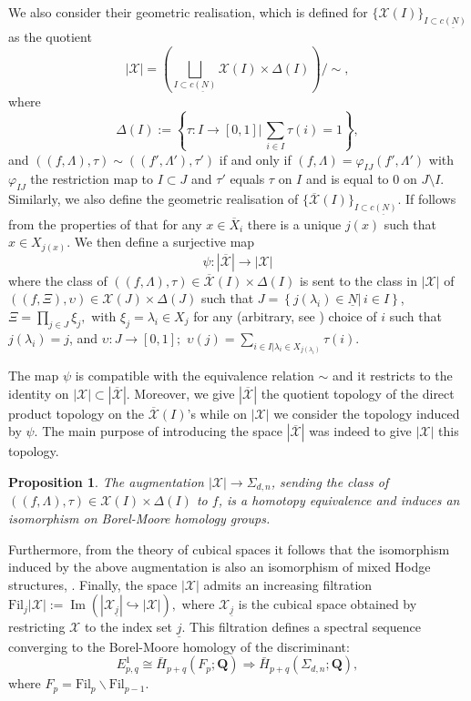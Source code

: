 \documentclass[10pt,a4paper,twoside]{amsart}
\theoremstyle{plain}
\newtheorem{prop}[theo]{Proposition}
\theoremstyle{definition}
\theoremstyle{remark}
\begin{document}
We also consider their geometric realisation, which is defined for $\{\mathcal{X}(I)\}_{I\subset\underline{c(N)}}$ as the quotient
$$|\mathcal{X}|=\left(\bigsqcup_{I\subset\underline{c(N)}}\mathcal{X}(I)\times \Delta(I)\right)/\sim,$$
where 
$$\Delta(I):=\left\{\tau:I\rightarrow\left[0,1\right]|\,\sum_{i\in I} \tau(i)=1\right\},$$ 
and $((f,\Lambda),\tau)\sim((f',\Lambda'),\tau')$ if and only if $(f,\Lambda)=\varphi_{IJ}(f',\Lambda')$ with $\varphi_{IJ}$ the restriction map to $I \subset J$  and $\tau'$ equals $\tau$ on $I$ and is equal to $0$ on $J \setminus I$. 
Similarly, we also define the geometric realisation of $\{\overline{\mathcal{X}}(I)\}_{I\subset\underline{c(N)}}$. 
If follows from the properties of \cite[List 2.3]{TomM4} that for any $x \in \overline{X}_i$ there is a unique $j(x)$ such that $x \in X_{j(x)}$. We then define a surjective map
$$\psi:|\overline{\mathcal{X}}|\rightarrow |{\mathcal{X}}|$$
where the class of $((f,\Lambda),\tau)\in\overline{\mathcal{X}}(I)\times\Delta(I)$ is sent to the class in $|{\mathcal{X}}|$ 
of $((f,\Xi),\upsilon)\in \mathcal{X}(J)\times\Delta(J)$ such that $J=\left\{j(\lambda_i)\in\underline{N}|\, i\in I \right\}$, $\Xi=\prod_{j\in J}\xi_j,$ with $\xi_j=\lambda_i\in X_j$ for any (arbitrary, see \cite[List 2.3]{TomM4}) choice of $i$ such that $j(\lambda_i)=j$, and $\upsilon:J\rightarrow \left[0,1\right];$ $\upsilon(j)=\sum_{i\in I | \lambda_i\in X_{j(\lambda_i)}}\tau(i).$

The map $\psi$ is compatible with the equivalence relation $\sim$ and it restricts to the identity on $|{\mathcal{X}}|\subset|\overline{\mathcal{X}}|$.  
Moreover, we give $|\overline{\mathcal{X}}|$ 
the quotient topology of the direct product topology on the $\overline{\mathcal{X}}(I)$'s while on $|{\mathcal{X}}|$ 
we consider the topology induced by $\psi$. The main purpose of introducing the space $|\overline{\mathcal{X}}|$ was indeed to give $|{\mathcal{X}}|$ this topology.

\begin{prop}{\cite[Theorem 2.8]{Gor}} The augmentation 
$|{\mathcal{X}}|\rightarrow \Sigma_{d,n}$, sending the class of $((f,\Lambda),\tau) \in \mathcal{X}(I)\times\Delta(I)$ to $f$, is a homotopy equivalence and induces an isomorphism on Borel-Moore homology groups.
\end{prop} 
Furthermore, from the theory of cubical spaces it follows that the isomorphism induced by the above augmentation is also an isomorphism of mixed Hodge structures, \cite[Section 5.8]{PS08}. Finally, the space $|{\mathcal{X}}|$ 
admits an increasing filtration 
$\mathrm{Fil}_j|{\mathcal{X}}|:=\operatorname{Im}(|{\mathcal{X}}_{\underline{j}}|\hookrightarrow |{\mathcal{X}}|),$ 
where $\mathcal{X}_{\underline{j}}$  
is the cubical space obtained by restricting $\mathcal{X}$  
to the index set $\underline{j}.$
This filtration defines a spectral sequence converging to the Borel-Moore homology of the discriminant:
\begin{equation} \label{eq-spectral}
    E^1_{p,q}\cong \bar{H}_{p+q}(F_p;\mathbf{Q})\Rightarrow\bar{H}_{p+q}(\Sigma_{d,n};\mathbf{Q}),
\end{equation}
where $F_p=\mathrm{Fil}_p\backslash \mathrm{Fil}_{p-1}.$
\end{document}
